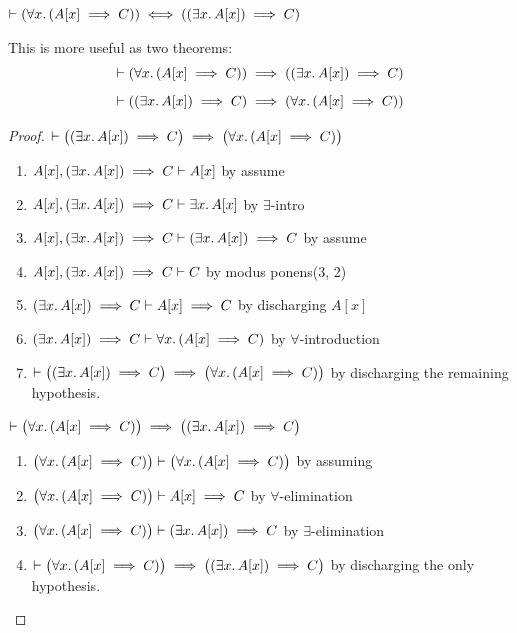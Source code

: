 \begin{node}%
$\vdash(\forall x\ldotp(A[x]\implies C))\iff((\exists x\ldotp A[x])\implies C)$

This is more useful as two theorems:
\begin{equation}
\vdash(\forall x\ldotp(A[x]\implies C))\implies((\exists x\ldotp A[x])\implies C)
\end{equation}  
\begin{equation}
\vdash((\exists x\ldotp A[x])\implies C)\implies(\forall x\ldotp(A[x]\implies C))
\end{equation}  
\end{node}

\begin{proof}
$\vdash\bigl((\exists x\ldotp A[x])\implies C\bigr)\implies\bigl(\forall x\ldotp(A[x]\implies C)\bigr)$
\begin{enumerate}
\item $A[x],(\exists x\ldotp A[x])\implies C\vdash A[x]$ by assume
\item $A[x],(\exists x\ldotp A[x])\implies C\vdash\exists x\ldotp A[x]$ by $\exists$-intro
\item $A[x],(\exists x\ldotp A[x])\implies C\vdash(\exists x\ldotp A[x])\implies C$ by assume
\item $A[x],(\exists x\ldotp A[x])\implies C\vdash C$ by modus ponens(3, 2)
\item $(\exists x\ldotp A[x])\implies C\vdash A[x]\implies C$ by
  discharging $A[x]$
\item $(\exists x\ldotp A[x])\implies C\vdash\forall x\ldotp(A[x]\implies C)$ by
  $\forall$-introduction
\item $\vdash\bigl((\exists x\ldotp A[x])\implies C\bigr)\implies\bigl(\forall x\ldotp(A[x]\implies C)\bigr)$ by
  discharging the remaining hypothesis.
\end{enumerate}
$\vdash\bigl(\forall x\ldotp(A[x]\implies C)\bigr)\implies\bigl((\exists x\ldotp A[x])\implies C\bigr)$
\begin{enumerate}
\item $\bigl(\forall x\ldotp(A[x]\implies C)\bigr)\vdash\bigl(\forall x\ldotp(A[x]\implies C)\bigr)$
  by assuming
\item $\bigl(\forall x\ldotp(A[x]\implies C)\bigr)\vdash A[x]\implies C$
  by $\forall$-elimination
\item $\bigl(\forall x\ldotp(A[x]\implies C)\bigr)\vdash(\exists x\ldotp A[x])\implies C$
  by $\exists$-elimination
\item $\vdash\bigl(\forall x\ldotp(A[x]\implies C)\bigr)\implies\bigl((\exists x\ldotp A[x])\implies C\bigr)$
  by discharging the only hypothesis.\qedhere
\end{enumerate}
\end{proof}

